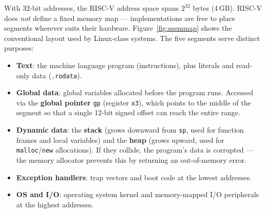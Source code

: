 \documentclass[9pt, a4paper]{extarticle}
\begin{document}
With 32-bit addresses, the RISC-V address space spans $2^{32}$ bytes (4\,GB). RISC-V does \emph{not} define a fixed memory map --- implementations are free to place segments wherever suits their hardware. Figure~\ref{fig:memmap} shows the conventional layout used by Linux-class systems. The five segments serve distinct purposes:

\begin{itemize}
    \item \textbf{Text}: the machine language program (instructions), plus literals and read-only data (\texttt{.rodata}).
    \item \textbf{Global data}: global variables allocated before the program runs. Accessed via the \textbf{global pointer} \texttt{gp} (register \texttt{x3}), which points to the middle of the segment so that a single 12-bit signed offset can reach the entire range.
    \item \textbf{Dynamic data}: the \textbf{stack} (grows downward from \texttt{sp}, used for function frames and local variables) and the \textbf{heap} (grows upward, used for \texttt{malloc}/\texttt{new} allocations). If they collide, the program's data is corrupted --- the memory allocator prevents this by returning an out-of-memory error.
    \item \textbf{Exception handlers}: trap vectors and boot code at the lowest addresses.
    \item \textbf{OS and I/O}: operating system kernel and memory-mapped I/O peripherals at the highest addresses.
\end{itemize}
\end{document}
